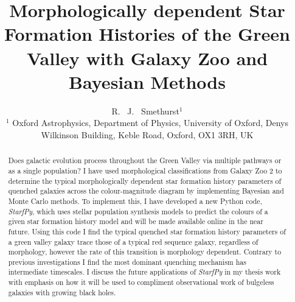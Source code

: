 \documentclass{mn2e}
\begin{document}
\title[Bayesian methods with Galaxy Zoo]{Morphologically dependent Star Formation Histories of the Green Valley with Galaxy Zoo and Bayesian Methods}
\author[Smethurst et al. 2014]{R. ~J. ~Smethurst$^1$
\\ $^1$ Oxford Astrophysics, Department of Physics, University of Oxford, Denys Wilkinson Building, Keble Road, Oxford, OX1 3RH, UK }

\maketitle

\begin{abstract}
Does galactic evolution process throughout the Green Valley via multiple pathways or as a single population? I have used morphological classifications from Galaxy Zoo 2 to determine the typical morphologically dependent star formation history parameters of quenched galaxies across the colour-magnitude diagram by implementing Bayesian and Monte Carlo methods. To implement this, I have developed a new Python code, \emph{StarfPy}, which uses stellar population synthesis models to predict the colours of a given star formation history model and will be made available online in the near future. Using this code I find the typical quenched star formation history parameters of a green valley galaxy trace those of a typical red sequence galaxy, regardless of morphology, however the rate of this transition is morphology dependent. Contrary to previous investigations I find the most dominant quenching mechanism has intermediate timescales. I discuss the future applications of \emph{StarfPy} in my thesis work with emphasis on how it will be used to compliment observational work of bulgeless galaxies with growing black holes. 
\end{abstract}
\end{document}
